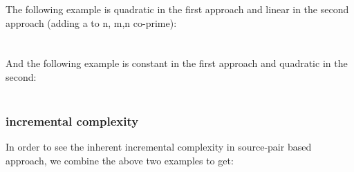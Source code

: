 The following example is quadratic in the first approach and linear in the second approach (adding a to n, m,n co-prime):\\
\\
\\
And the following example is constant in the first approach and quadratic in the second:\\
\\

\subsubsection*{incremental complexity}
In order to see the inherent incremental complexity in source-pair based approach, we combine the above two examples to get:

